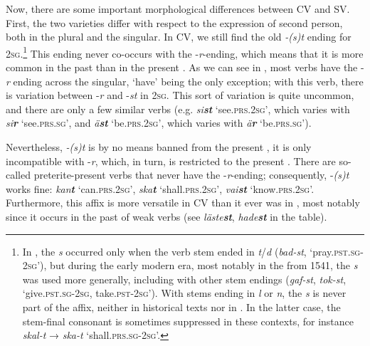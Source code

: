 \documentclass[output=paper,colorlinks,citecolor=brown,draft,draftmode]{langscibook}
\begin{document}
Now, there are some important morphological differences between CV and SV. First, the two varieties differ with respect to the expression of second person, both in the plural and the singular. In CV, we still find the old \textit{-(s)t} ending for 2\textsc{sg}.\footnote{In , the \textit{s} occurred only when the verb stem ended in \textit{t}/\textit{d} (\textit{bad-st}, ‘pray.\textsc{pst.sg}-\textsc{2sg}’), but during the early modern era, most notably in the  from 1541, the \textit{s} was used more generally, including with other stem endings (\textit{gaf-st}, \textit{tok-st}, ‘give.\textsc{pst.sg}-2\textsc{sg}, take.\textsc{pst}-\textsc{2sg}’). With stems ending in \textit{l} or \textit{n}, the \textit{s} is never part of the affix, neither in historical texts nor in . In the latter case, the stem-final consonant is sometimes suppressed in these contexts, for instance \textit{skal-t} → \textit{ska-t} ‘shall.\textsc{prs.sg}-2\textsc{sg}’.} This ending never co-occurs with the -\textit{r}-ending, which means that it is more common in the past than in the present . As we can see in , most verbs have the -\textit{r} ending across the singular, ‘have’ being the only exception; with this verb, there is variation between -\textit{r} and -\textit{st} in 2\textsc{sg}. This sort of variation is quite uncommon, and there are only a few similar verbs (e.g. \textit{si\textbf{{st}}} ‘see.\textsc{prs}.2\textsc{sg}’, which varies with \textit{si\textbf{{r}}} ‘see.\textsc{prs}.\textsc{sg}’, and \textit{ä\textbf{{st}}} ‘be.\textsc{prs.}2\textsc{sg}’, which varies with \textit{ä\textbf{{r}}} ‘be.\textsc{prs}.\textsc{sg}’).



Nevertheless, \textit{-(s)t} is by no means banned from the present , it is only incompatible with -\textit{r}, which, in turn, is restricted to the present . There are so-called preterite-present verbs that never have the -\textit{r}-ending; consequently, \mbox{-\textit{(s)t}} works fine: \textit{kan\textbf{{t}}} ‘can.\textsc{prs}.2\textsc{sg}’, \textit{ska\textbf{{t}}} ‘shall.\textsc{prs}.2\textsc{sg}’, \textit{vai\textbf{{st}}} ‘know.\textsc{prs.}2\textsc{sg}’. Furthermore, this affix is more versatile in CV than it ever was in , most notably since it occurs in the past  of weak verbs (see \textit{läste\textbf{{st}}}, \textit{hade\textbf{{st}}} in the table).
\end{document}

